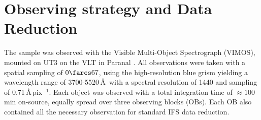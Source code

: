 \documentclass[fleqn,usenatbib,useAMS]{mnras}
\begin{document}


\section{Observing strategy and Data Reduction}
	\label{sec:obs}
	The sample was observed with the Visible Multi-Object Spectrograph (VIMOS), mounted on UT3 on the VLT in Paranal \citep{LeFevre2003}. All observations were taken with a spatial sampling of $0\farcs67$, using the high-resolution blue grism yielding a wavelength range of 3700-5520\,\AA\ with a spectral resolution of 1440 and sampling of 0.71\,\AA\,$\mathrm{pix^{-1}}$. Each object was observed with a total integration time of $\approx 100$\,min on-source, equally spread over three observing blocks (OBs). Each OB also contained all the necessary observation for standard IFS data reduction. 


\end{document}

